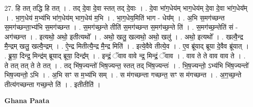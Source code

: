 \documentclass[17pt]{extarticle}
\begin{document}
27. हि तत् तद्धि हि तत् । . तद् दे॒वा दे॒वा स्तत् तद् दे॒वाः । . दे॒वा भा॑ग॒धेय॑म् भाग॒धेय॑म् दे॒वा दे॒वा भा॑ग॒धेय᳚म् । . भा॒ग॒धेय॑ म॒भ्य॑भि भा॑ग॒धेय॑म् भाग॒धेय॑ म॒भि । . भा॒ग॒धेय॒मिति॑ भाग - धेय᳚म् । . अ॒भि स॒मग॑च्छन्त स॒मग॑च्छन्ता॒भ्य॑भि स॒मग॑च्छन्त । . स॒मग॑च्छ॒न्ते तीति॑ स॒मग॑च्छन्त स॒मग॑च्छ॒न्ते ति॑ । . स॒मग॑च्छ॒न्तेति॑ सं - अग॑च्छन्त । . इत्यथो॒ अथो॒ इतीत्यथो᳚ । . अथो॒ खलु॒ खल्वथो॒ अथो॒ खलु॑ । . अथो॒ इत्यथो᳚ । . खल्वै॒न्द्र मै॒न्द्रम् खलु॒ खल्वै॒न्द्रम् । . ऐ॒न्द्र मितीत्यै॒न्द्र मै॒न्द्र मिति॑ । . इत्ये॒वैवे तीत्ये॒व । . ए॒व ब्रू॑याद् ब्रूया दे॒वैव ब्रू॑यात् । . ब्रू॒या॒ दिन्द्र॒ मिन्द्र॑म् ब्रूयाद् ब्रूया॒ दिन्द्र᳚म् । . इन्द्रं॒ ॅवाव वावे न्द्र॒ मिन्द्रं॒ ॅवाव । . वाव ते ते वाव वाव ते । . ते तत् तत् ते ते तत् । . तद् भि॑ष॒ज्यन्तो॑ भिष॒ज्यन्त॒ स्तत् तद् भि॑ष॒ज्यन्तः॑ । . भि॒ष॒ज्यन्तो॒ ऽभ्य॑भि भि॑ष॒ज्यन्तो॑ भिष॒ज्यन्तो॒ ऽभि । . अ॒भि सꣳ स म॒भ्य॑भि सम् । . स म॑गच्छन्ता गच्छन्त॒ सꣳ स म॑गच्छन्त । . अ॒ग॒च्छ॒न्ते तीत्य॑गच्छन्ता गच्छ॒न्ते ति॑ । . इतीतीति॑ । \newline

\textbf{Ghana Paata } \newline
\end{document}
